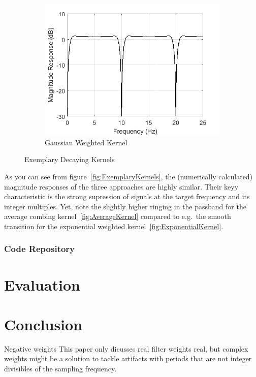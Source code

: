 \documentclass[a4paper]{article}
\begin{document}
\begin{figure}[hbtp]
\begin{subfigure}{.33\textwidth}
        \includegraphics[width=\textwidth]{img/mag_gauss.png}
        \caption{Gaussian Weighted Kernel}\label{fig:GaussKernel}
    \end{subfigure}
    \caption{Exemplary Decaying Kernels}\label{fig:DecayKernels}
\end{figure}

As you can see from figure~\ref{fig:ExemplaryKernels}, the (numerically calculated) magnitude responses of the three approaches are highly similar.
Their keyy characteristic is the strong supression of signals at the target frequency and its integer multiples.
Yet, note the slightly higher ringing in the passband for the average combing kernel~\ref{fig:AverageKernel} compared to e.g.\ the smooth transition for the exponential weighted kernel~\ref{fig:ExponentialKernel}.

\subsubsection{Code Repository}











\section{Evaluation}

\section{Conclusion}


Negative weights
This paper only dicusses real filter weights real, but complex weights might be a solution to tackle artifacts with periods that are not integer divisibles of the sampling frequency.



\end{document}
